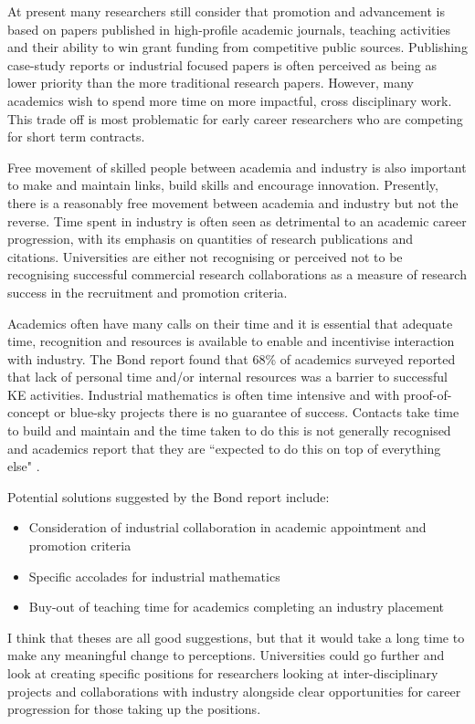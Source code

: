 \documentclass[11pt]{article} %
\begin{document}
	At present many researchers still consider that promotion and advancement is based on papers published in high-profile academic journals, teaching activities and their ability to win grant funding from competitive public sources. Publishing case-study reports or industrial focused papers is often perceived as being as lower priority than the more traditional research papers. However, many academics wish to spend more time on more impactful, cross disciplinary work. This trade off is  most problematic for early career researchers who are competing for short term contracts. 
	
	Free movement of skilled people between academia and industry is also important to make and maintain links, build skills and encourage innovation. Presently, there is a reasonably free movement between academia and industry but not the reverse. Time spent in industry is often seen as detrimental to an academic career progression, with its  emphasis on  quantities of research publications and citations.  Universities are either not recognising or perceived not to be recognising successful commercial research collaborations as a measure of research success in the recruitment and promotion criteria. 
	
	Academics often have many calls on their time and it is essential that adequate time, recognition and resources is available to enable and incentivise interaction with industry. The Bond report \cite{Bond} found that  68\% of academics surveyed reported that lack of personal time and/or internal resources was a barrier to successful KE activities.  
	Industrial mathematics is often time intensive and with proof-of-concept or blue-sky projects there is no guarantee of success. Contacts take time to build and maintain and the time taken to do this is not generally recognised and academics report that they are ``expected to do this on top of everything else" \cite{Bond}.
	
	Potential solutions suggested by the Bond report include: 
	\begin{itemize}
		\item Consideration of industrial collaboration in academic appointment and promotion criteria
		\item Specific accolades for industrial mathematics
		\item Buy-out of teaching time for academics completing an industry placement
	\end{itemize} 

I think that theses are all good suggestions, but that it would take a long time to make any meaningful change to perceptions. Universities could go further and look at creating specific positions  for researchers looking at inter-disciplinary projects and collaborations with industry alongside clear opportunities for career progression for those taking up the positions. 
\end{document}
